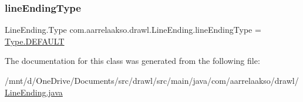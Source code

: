 \subsubsection{\texorpdfstring{line\+Ending\+Type}{lineEndingType}}
{\footnotesize\ttfamily Line\+Ending.\+Type com.\+aarrelaakso.\+drawl.\+Line\+Ending.\+line\+Ending\+Type = \hyperlink{enumcom_1_1aarrelaakso_1_1drawl_1_1_line_ending_1_1_type_a60839eb2ed0486a6f9f987c64d27e313}{Type.\+D\+E\+F\+A\+U\+LT}\hspace{0.3cm}{\ttfamily [private]}}



The documentation for this class was generated from the following file\+:\begin{DoxyCompactItemize}
\item 
/mnt/d/\+One\+Drive/\+Documents/src/drawl/src/main/java/com/aarrelaakso/drawl/\hyperlink{_line_ending_8java}{Line\+Ending.\+java}\end{DoxyCompactItemize}
